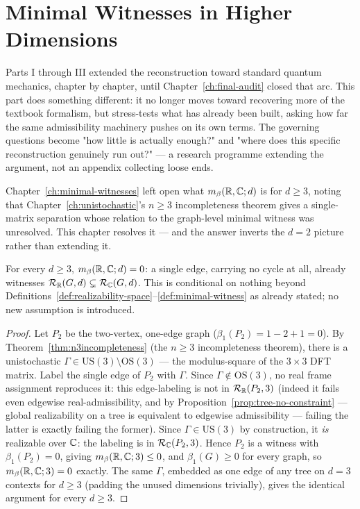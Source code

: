 \chapter{Minimal Witnesses in Higher Dimensions}
\label{ch:higher-d-witnesses}

Parts I through III extended the reconstruction toward standard quantum
mechanics, chapter by chapter, until Chapter~\ref{ch:final-audit} closed that
arc. This part does something different: it no longer moves toward recovering
more of the textbook formalism, but stress-tests what has already been built,
asking how far the same admissibility machinery pushes on its own terms.
The governing questions become "how little is actually enough?" and "where
does this specific reconstruction genuinely run out?" — a research programme
extending the argument, not an appendix collecting loose ends.

Chapter~\ref{ch:minimal-witnesses} left open what $m_\beta(\mathbb{R},\mathbb{C};d)$ is for
$d\ge3$, noting that Chapter~\ref{ch:unistochastic}'s $n\ge3$ incompleteness
theorem gives a single-matrix separation whose relation to the graph-level
minimal witness was unresolved. This chapter resolves it — and the answer
inverts the $d=2$ picture rather than extending it.

\begin{theorem}
\label{thm:higher-d-collapse}
For every $d \ge 3$, $m_\beta(\mathbb{R},\mathbb{C};d) = 0$: a single edge, carrying no
cycle at all, already witnesses $\mathcal R_{\mathbb{R}}(G,d) \subsetneq \mathcal
R_{\mathbb{C}}(G,d)$. This is conditional on nothing beyond
Definitions~\ref{def:realizability-space}--\ref{def:minimal-witness} as
already stated; no new assumption is introduced.
\end{theorem}

\begin{proof}
Let $P_2$ be the two-vertex, one-edge graph ($\beta_1(P_2) = 1-2+1 = 0$).
By Theorem~\ref{thm:n3incompleteness} (the $n\ge3$ incompleteness theorem),
there is a unistochastic $\Gamma \in \mathrm{US}(3)\setminus\mathrm{OS}(3)$
— the modulus-square of the $3\times3$ DFT matrix. Label the single edge of
$P_2$ with $\Gamma$. Since $\Gamma \notin \mathrm{OS}(3)$, no real frame
assignment reproduces it: this edge-labeling is not in $\mathcal R_{\mathbb{R}}(P_2,3)$
(indeed it fails even edgewise real-admissibility, and by
Proposition~\ref{prop:tree-no-constraint} — global realizability on a tree
is equivalent to edgewise admissibility — failing the latter is exactly
failing the former). Since $\Gamma \in \mathrm{US}(3)$ by construction, it
\emph{is} realizable over $\mathbb{C}$: the labeling is in $\mathcal R_{\mathbb{C}}(P_2,3)$.
Hence $P_2$ is a witness with $\beta_1(P_2)=0$, giving $m_\beta(\mathbb{R},\mathbb{C};3)
\le 0$, and $\beta_1(G)\ge0$ for every graph, so $m_\beta(\mathbb{R},\mathbb{C};3)=0$
exactly. The same $\Gamma$, embedded as one edge of any tree on $d=3$
contexts for $d\ge3$ (padding the unused dimensions trivially), gives the
identical argument for every $d\ge3$.
\end{proof}

